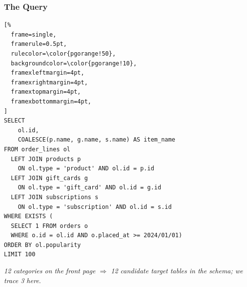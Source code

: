 \documentclass{beamer}
\begin{document}
\begin{frame}[fragile]\frametitle{The Query}
\begin{lstlisting}[%
  frame=single,
  framerule=0.5pt,
  rulecolor=\color{pgorange!50},
  backgroundcolor=\color{pgorange!10},
  framexleftmargin=4pt,
  framexrightmargin=4pt,
  framextopmargin=4pt,
  framexbottommargin=4pt,
]
SELECT
    ol.id,
    COALESCE(p.name, g.name, s.name) AS item_name
FROM order_lines ol
  LEFT JOIN products p
    ON ol.type = 'product' AND ol.id = p.id
  LEFT JOIN gift_cards g
    ON ol.type = 'gift_card' AND ol.id = g.id
  LEFT JOIN subscriptions s
    ON ol.type = 'subscription' AND ol.id = s.id
WHERE EXISTS (
  SELECT 1 FROM orders o
  WHERE o.id = ol.id AND o.placed_at >= 2024/01/01)
ORDER BY ol.popularity
LIMIT 100
\end{lstlisting}

\vspace{2mm}
{\footnotesize\itshape \textcolor{black!70}{12 categories on the front page $\Rightarrow$ 12 candidate target tables in the schema; we trace 3 here.}}
\end{frame}


%
%
%
%
\end{document}
